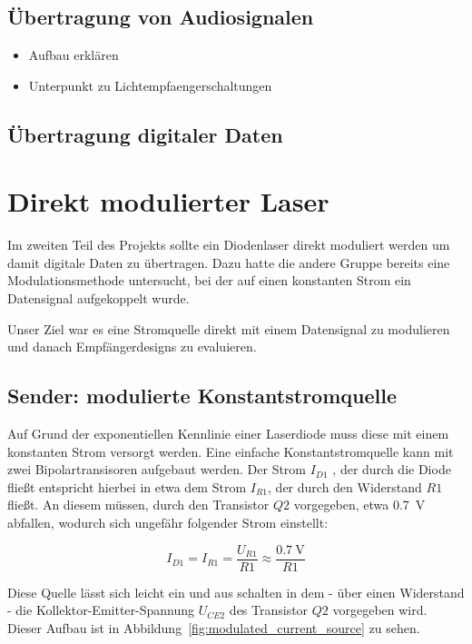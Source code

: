 \documentclass[12pt,a4paper]{article}
\begin{document}
\subsection{Übertragung von Audiosignalen}
\begin{itemize}
\item Aufbau erklären
\item Unterpunkt zu Lichtempfaengerschaltungen
\end{itemize}

\subsection{Übertragung digitaler Daten}






\section{Direkt modulierter Laser}
Im zweiten Teil des Projekts sollte ein Diodenlaser direkt moduliert werden um damit digitale Daten zu übertragen. Dazu hatte die andere Gruppe bereits eine Modulationsmethode untersucht, bei der auf einen konstanten Strom ein Datensignal aufgekoppelt wurde.

Unser Ziel war es eine Stromquelle direkt mit einem Datensignal zu modulieren und danach Empfängerdesigns zu evaluieren.


\subsection{Sender: modulierte Konstantstromquelle}
\label{sec:direct_tx}
Auf Grund der exponentiellen Kennlinie einer Laserdiode muss diese mit einem konstanten Strom versorgt werden. Eine einfache Konstantstromquelle kann mit zwei Bipolartransisoren aufgebaut werden. Der Strom $I_{D1}$ , der durch die Diode fließt entspricht hierbei in etwa dem Strom $I_{R1}$, der durch den Widerstand $R1$ fließt. An diesem müssen, durch den Transistor  $Q2$ vorgegeben, etwa \SI{0.7}{\volt} abfallen, wodurch sich ungefähr folgender Strom einstellt:

\begin{equation}
I_{D1} = I_{R1} = \frac{U_{R1}}{R1} \approx \frac{\SI{0.7}{\volt}}{R1}
\end{equation}

Diese Quelle lässt sich leicht ein und aus schalten in dem - über einen Widerstand - die Kollektor-Emitter-Spannung $U_{CE2}$ des Transistor $Q2$ vorgegeben wird. Dieser Aufbau ist in Abbildung~\ref{fig:modulated_current_source} zu sehen.
\end{document}
